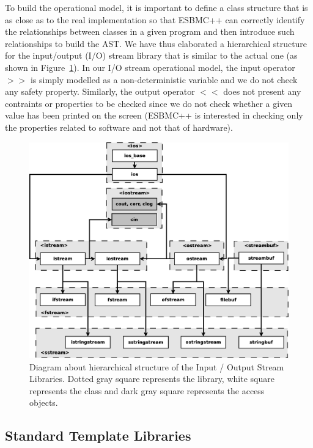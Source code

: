 \documentclass[a4paper]{llncs}
\begin{document}
To build the operational model, it is important 
to define a class structure that is as close as to the 
real implementation so that ESBMC++ can correctly identify 
the relationships between classes in a given program and 
then introduce such relationships to build the AST. 
We have thus elaborated a hierarchical structure for the
input/output (I/O) stream library that is similar to the actual 
one (as shown in Figure~\ref{figure:cpp-inputoutputdiagram}). 
In our I/O stream operational model, the input operator $>>$ 
is simply modelled as a non-deterministic variable and we do not check 
any safety property. Similarly, the output operator $<<$ does not 
present any contraints or properties to be checked since
we do not check whether a given value has been printed on the screen
(ESBMC++ is interested in checking only the properties related to 
software and not that of hardware).


\begin{figure}[ht]
\centering
\includegraphics[scale=0.24]{figures/inputoutputdiagram}
\caption{Diagram about hierarchical structure of the Input / Output Stream Libraries.
Dotted gray square represents the library, white square represents the class and dark gray square represents the access objects.}
\label{figure:cpp-inputoutputdiagram}
\end{figure}

\subsection{Standard Template Libraries}
\end{document}

